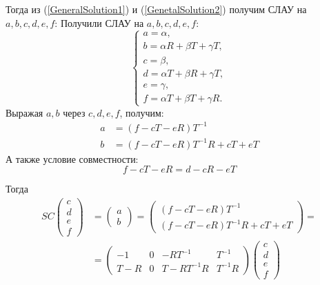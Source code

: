 \documentclass[a4 paper, 12 pt]{extarticle}
\begin{document}
   Тогда из (\ref{GeneralSolution1}) и (\ref{GenetalSolution2}) получим СЛАУ на $a, b, c, d, e, f$:
   Получили СЛАУ на $a, b, c, d, e, f$:
   \[
   \begin{cases}
   a = \alpha, \\
   b = \alpha R + \beta T + \gamma T, \\
   c = \beta, \\
   d = \alpha T + \beta R + \gamma T, \\
   e = \gamma, \\
   f = \alpha T + \beta T + \gamma R.
   \end{cases}
   \]
   Выражая $a, b$ через $c, d, e, f$, получим:
   \[
   \begin{aligned}
   a &= \left(f - cT - eR\right)T^{-1} \\
   b &= \left(f - cT - eR\right)T^{-1}R + cT + eT
   \end{aligned}
   \]
   А также условие совместности:
   \begin{equation}
   \label{compabilityCondition}
   f - cT - eR = d - cR - eT
   \end{equation}
   
   Тогда
   \[
   \begin{aligned}
   SC\left(
   \begin{array}{c}
   c \\
   d \\
   e \\
   f
   \end{array}\right) &= \left(\begin{array}{c}
   a \\
   b
   \end{array}\right) = 
   \left(\begin{array}{c}
   \left(f - cT - eR\right)T^{-1} \\
   \left(f - cT - eR\right)T^{-1}R + cT + eT
   \end{array}\right) =\\
   &= \left(\begin{array}{cccc}
   -1 & 0 & -RT^{-1} & T^{-1} \\
   T-R & 0 & T-RT^{-1}R & T^{-1}R
   \end{array}\right)
   \left(\begin{array}{c}
   c \\
   d \\
   e \\
   f
   \end{array}\right)
   \end{aligned}\]
   
\end{document}
